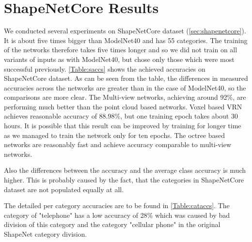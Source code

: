 \section{ShapeNetCore Results}
We conducted several experiments on ShapeNetCore dataset (\autoref{sec:shapenetcore}). It is about five times bigger than ModelNet40 and has 55 categories. The training of the networks therefore takes five times longer and so we did not train on all variants of inputs as with ModelNet40, but chose only those which were most successful previously. \autoref{Table:saccs} shows the achieved accuracies on ShapeNetCore dataset.
As can be seen from the table, the differences in measured accuracies across the networks are greater than in the case of ModelNet40, so the comparisons are more clear. The Multi-view networks, achieving around 92\%, are performing much better than the point cloud based networks. Voxel based VRN achieves reasonable accuracy of 88.98\%, but one training epoch takes about 30 hours. It is possible that this result can be improved by training for longer time as we managed to train the network only for ten epochs. The octree based networks are reasonably fast and achieve accuracy comparable to multi-view networks.  \par
Also the differences between the accuracy and the average class accuracy is much higher. This is probably caused by the fact, that the categories in ShapeNetCore dataset are not populated equally at all.\par



The detailed per category accuracies are to be found in \autoref{Table:cataccs}. The category of "telephone" has a low accuracy of 28\% which was caused by bad division of this category and the category "cellular phone" in the original ShapeNet category division.



